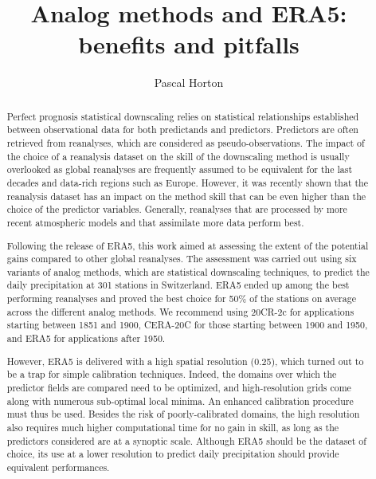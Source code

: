 \documentclass[alpha-refs]{wiley-article}
\title{Analog methods and ERA5: benefits and pitfalls}
\author[1]{Pascal Horton}
\affil[1]{Oeschger Centre for Climate Change Research and Institute of Geography, University of Bern, Bern, Switzerland}
\begin{document}
\maketitle

\begin{abstract}
Perfect prognosis statistical downscaling relies on statistical relationships established between observational data for both predictands and predictors. Predictors are often retrieved from reanalyses, which are considered as pseudo-observations. The impact of the choice of a reanalysis dataset on the skill of the downscaling method is usually overlooked as global reanalyses are frequently assumed to be equivalent for the last decades and data-rich regions such as Europe. However, it was recently shown that the reanalysis dataset has an impact on the method skill that can be even higher than the choice of the predictor variables. Generally, reanalyses that are processed by more recent atmospheric models and that assimilate more data perform best.

Following the release of ERA5, this work aimed at assessing the extent of the potential gains compared to other global reanalyses. The assessment was carried out using six variants of analog methods, which are statistical downscaling techniques, to predict the daily precipitation at 301 stations in Switzerland. ERA5 ended up among the best performing reanalyses and proved the best choice for 50\% of the stations on average across the different analog methods. We recommend using 20CR-2c for applications starting between 1851 and 1900, CERA-20C for those starting between 1900 and 1950, and ERA5 for applications after 1950.

However, ERA5 is delivered with a high spatial resolution (0.25\degree), which turned out to be a trap for simple calibration techniques. Indeed, the domains over which the predictor fields are compared need to be optimized, and high-resolution grids come along with numerous sub-optimal local minima. An enhanced calibration procedure must thus be used. Besides the risk of poorly-calibrated domains, the high resolution also requires much higher computational time for no gain in skill, as long as the predictors considered are at a synoptic scale. Although ERA5 should be the dataset of choice, its use at a lower resolution to predict daily precipitation should provide equivalent performances.



\end{abstract}
\end{document}
